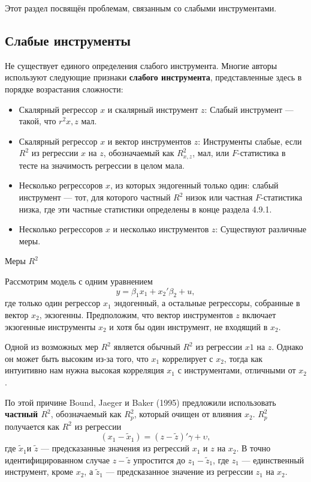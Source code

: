 Этот раздел посвящён проблемам, связанным со слабыми инструментами.

\subsection{Слабые инструменты}

Не существует единого определения слабого инструмента. Многие авторы используют следующие признаки \textbf{слабого инструмента}, представленные здесь в порядке возрастания сложности:
\begin{small}
\begin{itemize}
\item Скалярный регрессор $x$ и скалярный инструмент $z$: Слабый инструмент --- такой, что $r^2{x,z}$ мал.
\item Скалярный регрессор $x$ и вектор инструментов $z$: Инструменты слабые, если $R^2$ из регрессии $x$ на $z$, обозначаемый как $R^2_{x,z}$, мал, или $F$-статистика в тесте на значимость регрессии в целом мала.
\item Несколько регрессоров $x$, из которых эндогенный только один: слабый инструмент --- тот, для которого частный $R^2$ низок или частная $F$-статистика низка, где эти частные статистики определены в конце раздела 4.9.1. 
\item Несколько регрессоров $x$ и несколько инструментов $z$: Существуют различные меры.
\end{itemize}
\end{small}

\begin{center}
Меры $R^2$
\end{center}
Рассмотрим модель с одним уравнением
\begin{equation}
y = \beta_1 x_1 + x_2'\beta_2 +u,
\end{equation}
где только один регрессор $x_1$ эндогенный, а остальные регрессоры, собранные в вектор $x_2$, экзогенны. Предположим, что вектор инструментов $z$ включает экзогенные инструменты $x_2$ и хотя бы один инструмент, не входящий в $x_2$.

Одной из возможных мер $R^2$ является обычный $R^2$ из регрессии $x1$ на $z$. Однако он может быть высоким из-за того, что $x_1$ коррелирует с $x_2$, тогда как интуитивно нам нужна высокая корреляция $x_1$ с инструментами, отличными от $x_2$.

По этой причине Bound, Jaeger и Baker (1995) предложили использовать \textbf{частный $R^2$}, обозначаемый как $R^2_p$, который очищен от влияния $x_2$. $R^2_p$ получается как $R^2$ из регрессии  
\begin{equation}
(x_1-\tilde{x}_1)= (z-\widetilde{z})'\gamma + \upsilon,
\end{equation}
где $\tilde{x}_1$и  $\tilde{z}$ --- предсказанные значения из регрессий $x_1$ и $z$ на $x_2$. В точно идентифицированном случае $z-\tilde{z}$ упростится до $z_1-\tilde{z}_1$, где $z_1$ --- единственный инструмент, кроме $x_2$, а $\tilde{z}_1$ --- предсказанное значение из регрессии $z_1$ на $x_2$.

